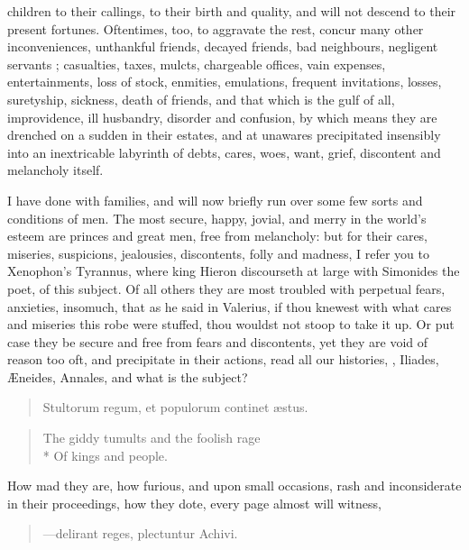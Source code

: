 {children to their callings, to their birth and quality, and will
not descend to their present fortunes. Oftentimes, too, to aggravate
the rest, concur many other inconveniences, unthankful friends, decayed
friends, bad neighbours, negligent servants ; casualties, taxes, mulcts, chargeable
offices, vain expenses, entertainments, loss of stock, enmities,
emulations, frequent invitations, losses, suretyship, sickness, death
of friends, and that which is the gulf of all, improvidence, ill
husbandry, disorder and confusion, by which means they are drenched on
a sudden in their estates, and at unawares precipitated insensibly into
an inextricable labyrinth of debts, cares, woes, want, grief,
discontent and melancholy itself.

I have done with families, and will now briefly run over some few sorts
and conditions of men. The most secure, happy, jovial, and merry in the
world's esteem are princes and great men, free from melancholy: but for
their cares, miseries, suspicions, jealousies, discontents, folly and
madness, I refer you to Xenophon's Tyrannus, where king Hieron
discourseth at large with Simonides the poet, of this subject. Of all
others they are most troubled with perpetual fears, anxieties,
insomuch, that as he said in Valerius, if thou knewest with what
cares and miseries this robe were stuffed, thou wouldst not stoop to
take it up. Or put case they be secure and free from fears and
discontents, yet they are void of reason too oft, and precipitate
in their actions, read all our histories, , Iliades, \AE{}neides, Annales, and what is the subject?

\begin{quote}
\textlatin{Stultorum regum, et populorum continet \ae{}stus.}
\end{quote}

\begin{verse}
The giddy tumults and the foolish rage\\*
Of kings and people.
\end{verse}

How mad they are, how furious, and upon small occasions, rash and
inconsiderate in their proceedings, how they dote, every page almost
will witness,

\begin{verse}
---\textlatin{delirant reges, plectuntur Achivi.}
\end{verse}

}
